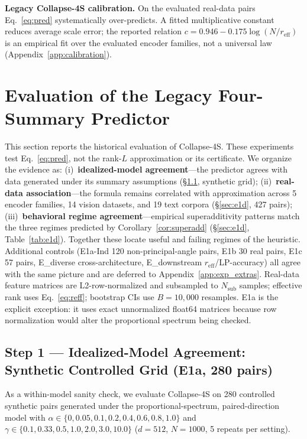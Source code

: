 \documentclass{article}
\newcommand{\reff}{\ensuremath{r_{\mathrm{eff}}}\xspace}
\begin{document}
\textbf{Legacy Collapse-4S calibration.}
On the evaluated real-data pairs Eq.~\eqref{eq:pred} systematically
over-predicts.  A fitted multiplicative constant reduces average scale error;
the reported relation $c{=}0.946{-}0.175\log(N/\reff)$ is an empirical fit
over the evaluated encoder families, not a universal law
(Appendix~\ref{app:calibration}).


\section{Evaluation of the Legacy Four-Summary Predictor}
\label{sec:experiments}

This section reports the historical evaluation of Collapse-4S.  These
experiments test Eq.~\eqref{eq:pred}, not the rank-$L$ approximation or its
certificate.  We organize the evidence as:
(i)~\textbf{idealized-model agreement}---the predictor agrees with data
generated under its summary assumptions (§\ref{sec:e1a_main}, synthetic grid);
(ii)~\textbf{real-data association}---the formula remains correlated with
approximation across 5 encoder families, 14 vision datasets,
and 19 text corpora (§\ref{sec:e1d}, 427 pairs);
(iii)~\textbf{behavioral regime agreement}---empirical superadditivity
patterns match the three regimes predicted by
Corollary~\ref{cor:superadd} (§\ref{sec:e1d}, Table~\ref{tab:e1d}).
Together these locate useful and failing regimes of the heuristic.
Additional controls (E1a-Ind 120 non-principal-angle pairs,
E1b 30 real pairs, E1c 57 pairs, E\_diverse cross-architecture,
E\_downstream $\reff$/LP-accuracy) all agree with the same picture
and are deferred to Appendix~\ref{app:exp_extras}.
Real-data feature matrices are L2-row-normalized and subsampled to
$N_{\mathrm{sub}}$ samples; effective rank uses Eq.~\eqref{eq:reff};
bootstrap CIs use $B=10{,}000$ resamples.  E1a is the explicit exception:
it uses exact unnormalized float64 matrices because row normalization would
alter the proportional spectrum being checked.

\subsection{Step 1 --- Idealized-Model Agreement: Synthetic Controlled Grid (E1a, 280 pairs)}
\label{sec:e1a_main}

As a within-model sanity check, we evaluate Collapse-4S on
280 controlled synthetic pairs generated under the proportional-spectrum,
paired-direction model
with $\alpha\in\{0,0.05,0.1,0.2,0.4,0.6,0.8,1.0\}$ and
$\gamma\in\{0.1,0.33,0.5,1.0,2.0,3.0,10.0\}$
($d{=}512$, $N{=}1000$, 5 repeats per setting).
\end{document}
